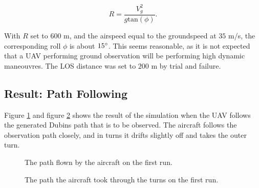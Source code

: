 \begin{equation}
	R = \frac{V_g^2}{g\text{tan}(\phi)}.
\end{equation}

With $R$ set to $600$ m, and the airspeed equal to the groundspeed at $35$ m/s, the corresponding roll $\phi$ is about $15\degree$. This seems reasonable, as it is not expected that a UAV performing ground observation will be performing high dynamic maneouvres. The LOS distance was set to $200$ m by trial and failure.


\subsection{Result: Path Following}

Figure \ref{fig:first_run_path} and figure \ref{fig:first_run_turns} shows the result of the simulation when the UAV follows the generated Dubins path that is to be observed. The aircraft follows the observation path closely, and in turns it drifts slightly off and takes the outer turn. 

\begin{figure}[]
    \centering
    \caption{The path flown by the aircraft on the first run.}
	\label{fig:first_run_path}
\end{figure}

\begin{figure}[]
    \centering
    \caption{The path the aircraft took through the turns on the first run.}
	\label{fig:first_run_turns}
\end{figure}

